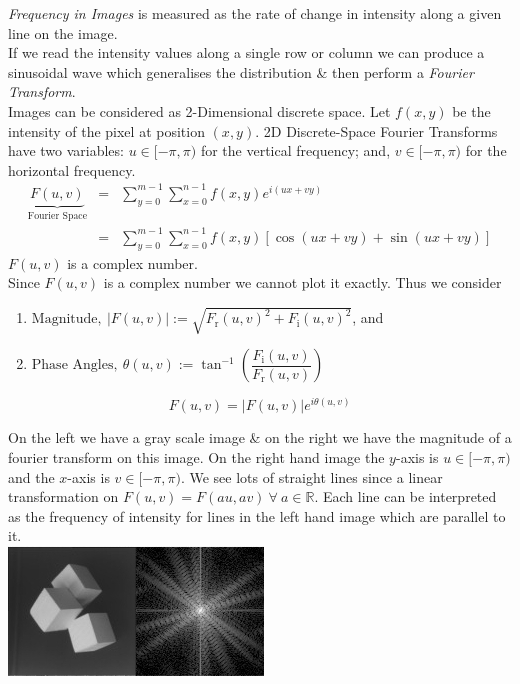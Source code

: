 \documentclass[11pt,a4paper]{article}
\begin{document}
\textit{Frequency in Images} is measured as the rate of change in intensity along a given line on the image.\\

If we read the intensity values along a single row or column we can produce a sinusoidal wave which generalises the distribution \& then perform a \textit{Fourier Transform}.\\

Images can be considered as 2-Dimensional discrete space. Let $f(x,y)$ be the intensity of the pixel at position $(x,y)$. 2D Discrete-Space Fourier Transforms have two variables: $u\in[-\pi,\pi)$ for the vertical frequency; and, $v\in[-\pi,\pi)$ for the horizontal frequency.
\[\begin{array}{rcl}
\underbrace{F(u,v)}_{\text{Fourier Space}}&=&{\displaystyle\sum_{y=0}^{m-1}\sum_{x=0}^{n-1}f(x,y)e^{i(ux+vy)}}\\
&=&{\displaystyle\sum_{y=0}^{m-1}\sum_{x=0}^{n-1}f(x,y)\left[\cos(ux+vy)+\sin(ux+vy)\right]}
\end{array}\]
\nb $F(u,v)$ is a complex number.\\

Since $F(u,v)$ is a complex number we cannot plot it exactly. Thus we consider
\begin{enumerate}[label=\roman*)]
	\item $\text{Magnitude},\ |F(u,v)|:=\sqrt{F_\text{r}(u,v)^2+F_\text{i}(u,v)^2}$, and
	\item $\text{Phase Angles},\ \theta(u,v):=\tan^{-1}\left(\dfrac{F_\text{i}(u,v)}{F_\text{r}(u,v)}\right)$
\end{enumerate}

$$F(u,v)=|F(u,v)|e^{i\theta(u,v)}$$

On the left we have a gray scale image \& on the right we have the magnitude of a fourier transform on this image. On the right hand image the $y$-axis is $u\in[-\pi,\pi)$ and the $x$-axis is $v\in[-\pi,\pi)$. We see lots of straight lines since a linear transformation on $F(u,v)=F(au,av)\ \forall\ a\in\mathbb{R}$. Each line can be interpreted as the frequency of intensity for lines in the left hand image which are parallel to it.\\
\includegraphics[scale=3]{img/fourier_transform_magnitude.jpg}\\
\end{document}
